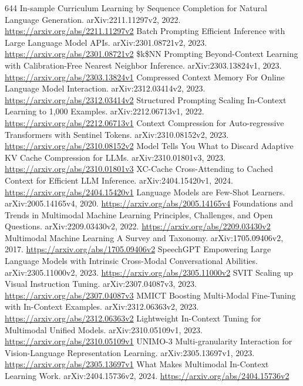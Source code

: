 \documentclass[11pt]{article}
\begin{document}
\begin{thebibliography}{644}
 In-sample Curriculum Learning by Sequence Completion for Natural Language Generation. arXiv:2211.11297v2, 2022. \url{https://arxiv.org/abs/2211.11297v2}
 Batch Prompting Efficient Inference with Large Language Model APIs. arXiv:2301.08721v2, 2023. \url{https://arxiv.org/abs/2301.08721v2}
 \$k\$NN Prompting Beyond-Context Learning with Calibration-Free Nearest Neighbor Inference. arXiv:2303.13824v1, 2023. \url{https://arxiv.org/abs/2303.13824v1}
 Compressed Context Memory For Online Language Model Interaction. arXiv:2312.03414v2, 2023. \url{https://arxiv.org/abs/2312.03414v2}
 Structured Prompting Scaling In-Context Learning to 1,000 Examples. arXiv:2212.06713v1, 2022. \url{https://arxiv.org/abs/2212.06713v1}
 Context Compression for Auto-regressive Transformers with Sentinel Tokens. arXiv:2310.08152v2, 2023. \url{https://arxiv.org/abs/2310.08152v2}
 Model Tells You What to Discard Adaptive KV Cache Compression for LLMs. arXiv:2310.01801v3, 2023. \url{https://arxiv.org/abs/2310.01801v3}
 XC-Cache Cross-Attending to Cached Context for Efficient LLM Inference. arXiv:2404.15420v1, 2024. \url{https://arxiv.org/abs/2404.15420v1}
 Language Models are Few-Shot Learners. arXiv:2005.14165v4, 2020. \url{https://arxiv.org/abs/2005.14165v4}
 Foundations and Trends in Multimodal Machine Learning Principles, Challenges, and Open Questions. arXiv:2209.03430v2, 2022. \url{https://arxiv.org/abs/2209.03430v2}
 Multimodal Machine Learning A Survey and Taxonomy. arXiv:1705.09406v2, 2017. \url{https://arxiv.org/abs/1705.09406v2}
 SpeechGPT Empowering Large Language Models with Intrinsic Cross-Modal Conversational Abilities. arXiv:2305.11000v2, 2023. \url{https://arxiv.org/abs/2305.11000v2}
 SVIT Scaling up Visual Instruction Tuning. arXiv:2307.04087v3, 2023. \url{https://arxiv.org/abs/2307.04087v3}
 MMICT Boosting Multi-Modal Fine-Tuning with In-Context Examples. arXiv:2312.06363v2, 2023. \url{https://arxiv.org/abs/2312.06363v2}
 Lightweight In-Context Tuning for Multimodal Unified Models. arXiv:2310.05109v1, 2023. \url{https://arxiv.org/abs/2310.05109v1}
 UNIMO-3 Multi-granularity Interaction for Vision-Language Representation Learning. arXiv:2305.13697v1, 2023. \url{https://arxiv.org/abs/2305.13697v1}
 What Makes Multimodal In-Context Learning Work. arXiv:2404.15736v2, 2024. \url{https://arxiv.org/abs/2404.15736v2}

\end{thebibliography}
\end{document}
